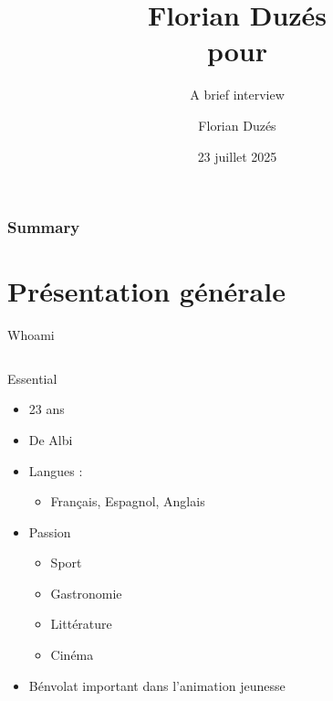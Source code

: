\documentclass[hyperref={bookmarks=false},aspectratio=169]{beamer}
\title[Florian pour \target]{\Huge{Florian Duzés} \\pour \\\bfseries{\target}}
\subtitle{A brief interview}
\author[Florian Duzés]{Florian Duzés}
\date[2025]{23 juillet 2025}
\begin{document}
\begin{frame}
    \titlepage
\end{frame}


\begin{frame}
\frametitle{Summary}
\tableofcontents
\end{frame}

\section{Présentation générale}

\begin{frame}{Whoami}

  \begin{columns}
    \begin{column}{0.7\textwidth}
      \begin{block}{Essential}
        \begin{itemize}
          \item<1-> 23 ans
          \item<2-> De Albi
          \item<3-> Langues :
          \begin{itemize}
            \item<3-> Français, Espagnol, Anglais
          \end{itemize}
          \item<4-> Passion
          \begin{itemize}
            \item<4-> Sport
            \item<4-> Gastronomie
            \item<4-> Littérature
            \item<4-> Cinéma
          \end{itemize}
          \item<5-> Bénvolat important dans l'animation jeunesse
        \end{itemize}
      \end{block}
    \end{column}


\end{columns}
\end{frame}
\end{document}

